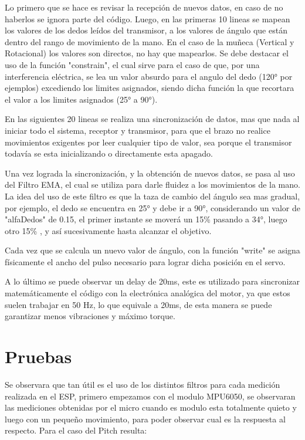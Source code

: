\documentclass[10pt]{article}
\begin{document}
Lo primero que se hace es revisar la recepción de nuevos datos, en caso de no haberlos se ignora parte del código. Luego, en las primeras 10 lineas se mapean los valores de los dedos leídos del transmisor, a los valores de ángulo que están dentro del rango de movimiento de la mano. En el caso de la muñeca (Vertical y Rotacional) los valores son directos, no hay que mapearlos. Se debe destacar el uso de la función "constrain", el cual sirve para el caso de que, por una interferencia eléctrica, se lea un valor absurdo para el angulo del dedo (120° por ejemplos) excediendo los limites asignados, siendo dicha función la que recortara el valor a los limites asignados (25° a 90°).  

En las siguientes 20 lineas se realiza una sincronización de datos, mas que nada al iniciar todo el sistema, receptor y transmisor, para que el brazo no realice movimientos exigentes por leer cualquier tipo de valor, sea porque el transmisor todavía se esta inicializando o directamente esta apagado. 

Una vez lograda la sincronización, y la obtención de nuevos datos, se pasa al uso del Filtro EMA, el cual se utiliza para darle fluidez a los movimientos de la mano. La idea del uso de este filtro es que la taza de cambio del ángulo sea mas gradual, por ejemplo, el dedo se encuentra en 25° y debe ir a 90°, considerando un valor de "alfaDedos" de 0.15, el primer instante se moverá un 15\% pasando a 34°, luego otro 15\% , y así sucesivamente hasta alcanzar el objetivo.

Cada vez que se calcula un nuevo valor de ángulo, con la función "write" se asigna físicamente el ancho del pulso necesario para lograr dicha posición en el servo.

A lo último se puede observar un delay de 20ms, este es utilizado para sincronizar matemáticamente el código con la electrónica analógica del motor, ya que estos suelen trabajar en 50 Hz, lo que equivale a 20ms, de esta manera se puede garantizar menos vibraciones y máximo torque. 


\section{Pruebas}

Se observara que tan útil es el uso de los distintos filtros para cada medición realizada en el ESP, primero empezamos con el modulo MPU6050, se observaran las mediciones obtenidas por el micro cuando es modulo esta totalmente quieto y luego con un pequeño movimiento, para poder observar cual es la respuesta al respecto. Para el caso del Pitch resulta:
\end{document}
